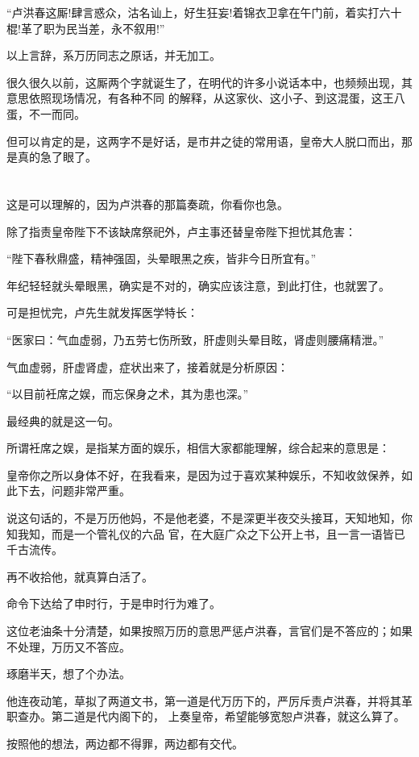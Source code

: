\documentclass[11pt,a4paper,onecolumn]{article}
\begin{document}
``卢洪春这厮!肆言惑众，沽名讪上，好生狂妄!着锦衣卫拿在午门前，着实打六十棍!革了职为民当差，永不叙用!''

以上言辞，系万历同志之原话，并无加工。

很久很久以前，这厮两个字就诞生了，在明代的许多小说话本中，也频频出现，其意思依照现场情况，有各种不同
的解释，从这家伙、这小子、到这混蛋，这王八蛋，不一而同。

但可以肯定的是，这两字不是好话，是市井之徒的常用语，皇帝大人脱口而出，那是真的急了眼了。

\section[\thesection]{}

这是可以理解的，因为卢洪春的那篇奏疏，你看你也急。

除了指责皇帝陛下不该缺席祭祀外，卢主事还替皇帝陛下担忧其危害：

``陛下春秋鼎盛，精神强固，头晕眼黑之疾，皆非今日所宜有。''

年纪轻轻就头晕眼黑，确实是不对的，确实应该注意，到此打住，也就罢了。

可是担忧完，卢先生就发挥医学特长：

``医家曰：气血虚弱，乃五劳七伤所致，肝虚则头晕目眩，肾虚则腰痛精泄。''

气血虚弱，肝虚肾虚，症状出来了，接着就是分析原因：

``以目前衽席之娱，而忘保身之术，其为患也深。''

最经典的就是这一句。

所谓衽席之娱，是指某方面的娱乐，相信大家都能理解，综合起来的意思是：

皇帝你之所以身体不好，在我看来，是因为过于喜欢某种娱乐，不知收敛保养，如此下去，问题非常严重。

说这句话的，不是万历他妈，不是他老婆，不是深更半夜交头接耳，天知地知，你知我知，而是一个管礼仪的六品
官，在大庭广众之下公开上书，且一言一语皆已千古流传。

再不收拾他，就真算白活了。

命令下达给了申时行，于是申时行为难了。

这位老油条十分清楚，如果按照万历的意思严惩卢洪春，言官们是不答应的；如果不处理，万历又不答应。

琢磨半天，想了个办法。

他连夜动笔，草拟了两道文书，第一道是代万历下的，严厉斥责卢洪春，并将其革职查办。第二道是代内阁下的，
上奏皇帝，希望能够宽恕卢洪春，就这么算了。

按照他的想法，两边都不得罪，两边都有交代。
\end{document}
